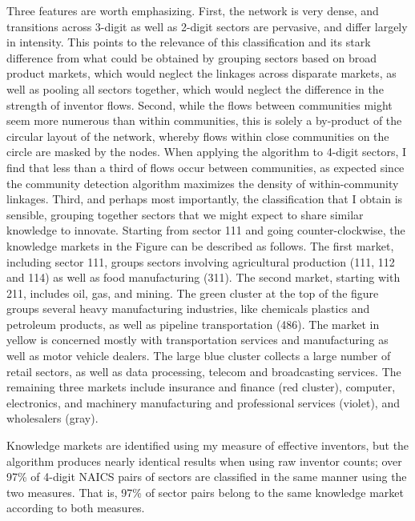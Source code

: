 Three features are worth emphasizing. First, the network is very dense,
and transitions across 3-digit as well as 2-digit sectors are pervasive,
and differ largely in intensity. This points to the relevance of this
classification and its stark difference from what could be obtained
by grouping sectors based on broad product markets, which would neglect
the linkages across disparate markets, as well as pooling all sectors
together, which would neglect the difference in the strength of inventor
flows. Second, while the flows between communities might seem more
numerous than within communities, this is solely a by-product of the
circular layout of the network, whereby flows within close communities
on the circle are masked by the nodes. When applying the algorithm
to 4-digit sectors, I find that less than a third of flows occur between
communities, as expected since the community detection algorithm maximizes
the density of within-community linkages. Third, and perhaps most
importantly, the classification that I obtain is sensible, grouping
together sectors that we might expect to share similar knowledge to
innovate. Starting from sector 111 and going counter-clockwise, the
knowledge markets in the Figure can be described as follows. The first
market, including sector 111, groups sectors involving agricultural
production (111, 112 and 114) as well as food manufacturing (311).
The second market, starting with 211, includes oil, gas, and mining.
The green cluster at the top of the figure groups several heavy manufacturing
industries, like chemicals plastics and petroleum products, as well
as pipeline transportation (486). The market in yellow is concerned
mostly with transportation services and manufacturing as well as motor
vehicle dealers. The large blue cluster collects a large number of
retail sectors, as well as data processing, telecom and broadcasting
services. The remaining three markets include insurance and finance
(red cluster), computer, electronics, and machinery manufacturing
and professional services (violet), and wholesalers (gray).

Knowledge markets are identified using my measure of effective inventors,
but the algorithm produces nearly identical results when using raw
inventor counts; over 97\% of 4-digit NAICS pairs of sectors are classified
in the same manner using the two measures. That is, 97\% of sector
pairs belong to the same knowledge market according to both measures.

